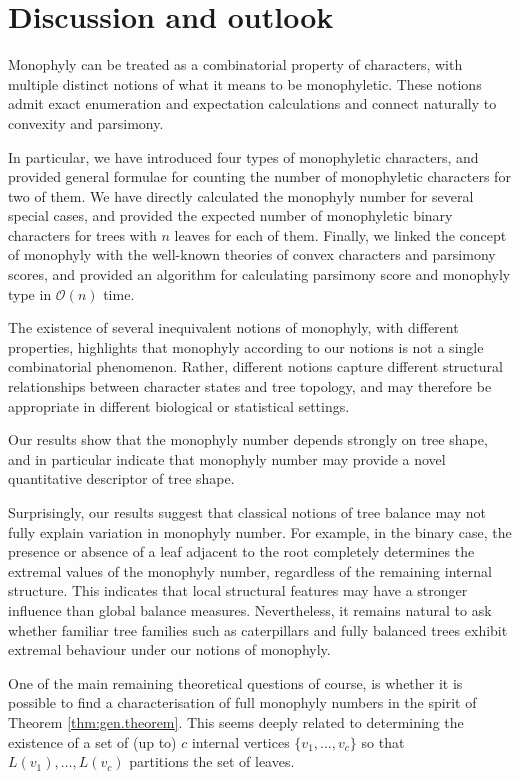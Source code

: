 \documentclass{amsart}
\theoremstyle{definition}
\begin{document}
\section{Discussion and outlook}

Monophyly can be treated as a combinatorial property of characters, with multiple distinct notions of what it means to be monophyletic. These notions admit exact enumeration and expectation calculations and connect naturally to convexity and parsimony. 

In particular, we have introduced four types of monophyletic characters, and provided general formulae for counting the number of monophyletic characters for two of them. We have directly calculated the monophyly number for several special cases, and provided the expected number of monophyletic binary characters for trees with $n$ leaves for each of them. Finally, we linked the concept of monophyly with the well-known theories of convex characters and parsimony scores, and provided an algorithm for calculating parsimony score and monophyly type in $\mathcal{O}(n)$ time.

The existence of several inequivalent notions of monophyly, with different properties, highlights that monophyly according to our notions is not a single combinatorial phenomenon. Rather, different notions capture different structural relationships between character states and tree topology, and may therefore be appropriate in different biological or statistical settings.

Our results show that the monophyly number depends strongly on tree shape, and in particular indicate that monophyly number may provide a novel quantitative descriptor of tree shape. 

Surprisingly, our results suggest that classical notions of tree balance may not fully explain variation in monophyly number. For example, in the binary case, the presence or absence of a leaf adjacent to the root completely determines the extremal values of the monophyly number, regardless of the remaining internal structure. This indicates that local structural features may have a stronger influence than global balance measures. Nevertheless, it remains natural to ask whether familiar tree families such as caterpillars and fully balanced trees exhibit extremal behaviour under our notions of monophyly.

One of the main remaining theoretical questions of course, is whether it is possible to find a characterisation of full monophyly numbers in the spirit of Theorem \ref{thm:gen.theorem}. This seems deeply related to determining the existence of a set of (up to) $c$ internal vertices $\{v_1,\dots,v_c\}$ so that $L(v_1),\dots,L(v_c)$ partitions the set of leaves.
\end{document}
